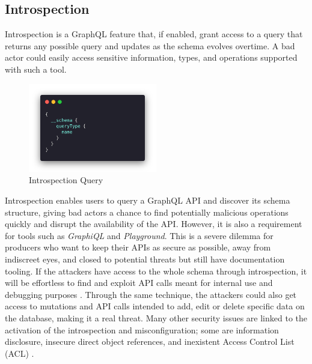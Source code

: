 \subsection{Introspection}
\label{s:Literature-Introspection}

Introspection is a GraphQL feature that, if enabled, grant access to a query
that returns any possible query and updates as the schema evolves overtime. A
bad actor could easily access sensitive information, types, and operations
supported with such a tool.

\begin{figure}[ht]
	\centering
	\includegraphics[width=0.5\textwidth]{figures/code/introspection.png}
	\caption{Introspection Query}
	\label{f:Introspection-Query}
\end{figure}

Introspection enables users to query a GraphQL API and discover its schema
structure, giving bad actors a chance to find potentially malicious operations
\citep{khalilWhyYouShould2021} quickly and disrupt the availability of the API.
However, it is also a requirement for tools such as \textit{GraphiQL} and
\textit{Playground}. This is a severe dilemma for producers who want to keep
their APIs as secure as possible, away from indiscreet eyes, and closed to
potential threats but still have documentation tooling. If the attackers have
access to the whole schema through introspection, it will be effortless to find
and exploit API calls meant for internal use and debugging purposes
\citep{rizwanGraphQLCommonVulnerabilities2021}. Through the same technique, the
attackers could also get access to mutations and API calls intended to add, edit
or delete specific data on the database, making it a real threat. Many other
security issues are linked to the activation of the introspection and
misconfiguration; some are information disclosure, insecure direct object
references, and inexistent Access Control List (ACL) \citep{
yeswehackHowExploitGraphQL2021}.


